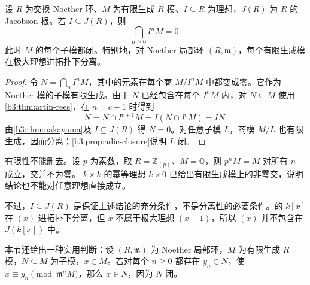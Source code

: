\begin{theorem}\label{b3:thm:krull-intersection}
	设 \(R\) 为交换 Noether 环、\(M\) 为有限生成 \(R\) 模、\(I\subseteq R\) 为理想，\(J(R)\) 为 \(R\) 的 Jacobson 根。若 \(I\subseteq J(R)\)，则
	\[
		\bigcap_{n\ge0}I^nM=0.
	\]
	此时 \(M\) 的每个子模都闭。特别地，对 Noether 局部环 \((R,\mathfrak m)\)，每个有限生成模在极大理想进拓扑下分离。
\end{theorem}
\begin{proof}
	令 \(N=\bigcap_nI^nM\)，其中的元素在每个商 \(M/I^nM\) 中都变成零。它作为 Noether 模的子模有限生成。由于 \(N\) 已经包含在每个 \(I^nM\) 内，对 \(N\subseteq M\) 使用\cref{b3:thm:artin-rees}，在 \(n=c+1\) 时得到
	\[
		N=N\cap I^{c+1}M=I(N\cap I^cM)=IN.
	\]
	由\cref{b3:thm:nakayama}及 \(I\subseteq J(R)\) 得 \(N=0\)。对任意子模 \(L\)，商模 \(M/L\) 也有限生成，因而分离；\cref{b3:prop:adic-closure}说明 \(L\) 闭。
\end{proof}

有限性不能删去。设 \(p\) 为素数，取 \(R=\mathbb Z_{(p)}\)、\(M=\mathbb Q\)，则 \(p^nM=M\) 对所有 \(n\) 成立，交并不为零。 \(k\times k\) 的幂等理想 \(k\times0\) 已给出有限生成模上的非零交，说明结论也不能对任意理想直接成立。

不过，\(I\subseteq J(R)\) 是保证上述结论的充分条件，不是分离性的必要条件。的 \(k[x]\) 在 \((x)\) 进拓扑下分离，但 \(x\) 不属于极大理想 \((x-1)\)，所以 \((x)\) 并不包含在 \(J(k[x])\) 中。

\ProseParagraphBreak
本节还给出一种实用判断：设 \((R,\mathfrak m)\) 为 Noether 局部环，\(M\) 为有限生成 \(R\) 模，\(N\subseteq M\) 为子模，\(x\in M\)。若对每个 \(n\ge0\) 都存在 \(y_n\in N\)，使 \(x\equiv y_n\pmod{\mathfrak m^nM}\)，那么 \(x\in N\)，因为 \(N\) 闭。
